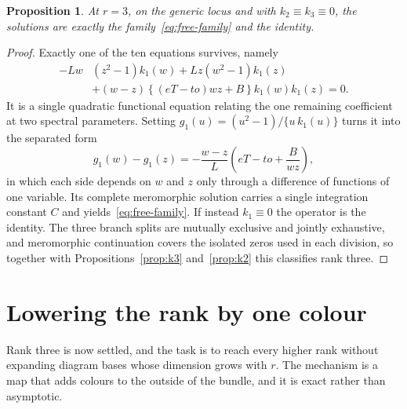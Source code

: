 \documentclass[
  aps,pre,
  reprint,
  superscriptaddress,
  amsmath,amssymb,
  floatfix
]{revtex4-2}
\theoremstyle{plain}
\newtheorem{proposition}[theorem]{Proposition}
\theoremstyle{definition}
\theoremstyle{remark}
\begin{document}
\begin{proposition}
\label{prop:k1}
At $r=3$, on the generic locus and with $k_2\equiv k_3\equiv0$, the solutions
are exactly the family~\eqref{eq:free-family} and the identity.
\end{proposition}

\begin{proof}
Exactly one of the ten equations survives, namely
\begin{equation}
  \begin{split}
  -Lw&(z^2-1)k_1(w)+Lz(w^2-1)k_1(z)\\
  &+(w-z)\left\{(eT-to)wz+B\right\}k_1(w)k_1(z)=0 .
  \end{split}
  \label{eq:k1-eq}
\end{equation}
It is a single quadratic functional equation relating the one remaining
coefficient at two spectral parameters. Setting $g_1(u)=(u^2-1)/\{u\,k_1(u)\}$
turns it into the separated form
\begin{equation}
  g_1(w)-g_1(z)=-\frac{w-z}{L}\left(eT-to+\frac{B}{wz}\right),
  \label{eq:k1-separated}
\end{equation}
in which each side depends on $w$ and $z$ only through a difference of
functions of one variable. Its complete meromorphic solution carries a single
integration constant $C$ and yields~\eqref{eq:free-family}. If instead
$k_1\equiv0$ the operator is the identity. The three branch splits are mutually
exclusive and jointly exhaustive, and meromorphic continuation covers the
isolated zeros used in each division, so together with
Propositions~\ref{prop:k3} and~\ref{prop:k2} this classifies rank three.
\end{proof}

\section{Lowering the rank by one colour}
\label{sec:peeling}

Rank three is now settled, and the task is to reach every higher rank without
expanding diagram bases whose dimension grows with $r$. The mechanism is a map
that adds colours to the outside of the bundle, and it is exact rather than
asymptotic.
\end{document}
